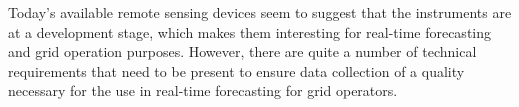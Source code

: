 

Today's available remote sensing devices seem to suggest that the instruments are at a development stage, which makes them interesting for real-time forecasting and grid operation purposes. However, there are quite a number of technical requirements that need to be present to ensure data collection of a quality necessary for the use in real-time forecasting for grid operators.\\ 

